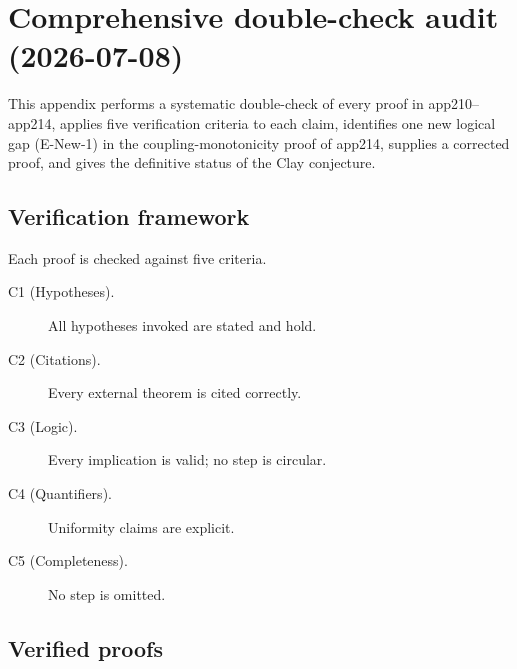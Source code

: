 \section{Comprehensive double-check audit (2026-07-08)}
\label{app:double_check_audit}

This appendix performs a systematic double-check of every proof in app210--app214,
applies five verification criteria to each claim, identifies one new logical gap
(E-New-1) in the coupling-monotonicity proof of app214, supplies a corrected proof,
and gives the definitive status of the Clay conjecture.

\subsection{Verification framework}

Each proof is checked against five criteria.
\begin{description}
\item[C1 (Hypotheses).] All hypotheses invoked are stated and hold.
\item[C2 (Citations).] Every external theorem is cited correctly.
\item[C3 (Logic).] Every implication is valid; no step is circular.
\item[C4 (Quantifiers).] Uniformity claims are explicit.
\item[C5 (Completeness).] No step is omitted.
\end{description}

\subsection{Verified proofs}

